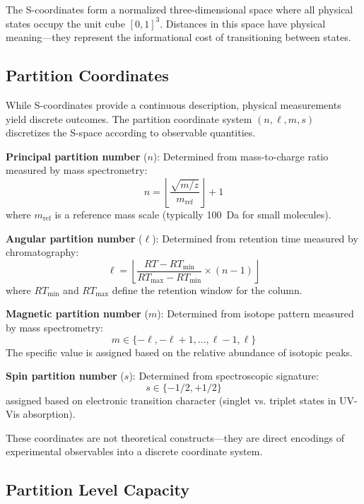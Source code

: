 \documentclass[twocolumn,superscriptaddress,prb,10pt]{revtex4-2}
\begin{document}
The S-coordinates form a normalized three-dimensional space where all physical states occupy the unit cube $[0,1]^3$. Distances in this space have physical meaning—they represent the informational cost of transitioning between states.

\subsection{Partition Coordinates}

While S-coordinates provide a continuous description, physical measurements yield discrete outcomes. The partition coordinate system $(n,\ell,m,s)$ discretizes the S-space according to observable quantities.

\textbf{Principal partition number} ($n$): Determined from mass-to-charge ratio measured by mass spectrometry:
\begin{equation}
n = \left\lfloor \frac{\sqrt{m/z}}{m_{\text{ref}}} \right\rfloor + 1
\label{eq:n}
\end{equation}
where $m_{\text{ref}}$ is a reference mass scale (typically 100~Da for small molecules).

\textbf{Angular partition number} ($\ell$): Determined from retention time measured by chromatography:
\begin{equation}
\ell = \left\lfloor \frac{RT - RT_{\min}}{RT_{\max} - RT_{\min}} \times (n-1) \right\rfloor
\label{eq:ell}
\end{equation}
where $RT_{\min}$ and $RT_{\max}$ define the retention window for the column.

\textbf{Magnetic partition number} ($m$): Determined from isotope pattern measured by mass spectrometry:
\begin{equation}
m \in \{-\ell, -\ell+1, \ldots, \ell-1, \ell\}
\label{eq:m}
\end{equation}
The specific value is assigned based on the relative abundance of isotopic peaks.

\textbf{Spin partition number} ($s$): Determined from spectroscopic signature:
\begin{equation}
s \in \{-1/2, +1/2\}
\label{eq:s}
\end{equation}
assigned based on electronic transition character (singlet vs. triplet states in UV-Vis absorption).

These coordinates are not theoretical constructs—they are direct encodings of experimental observables into a discrete coordinate system.

\subsection{Partition Level Capacity}
\end{document}
